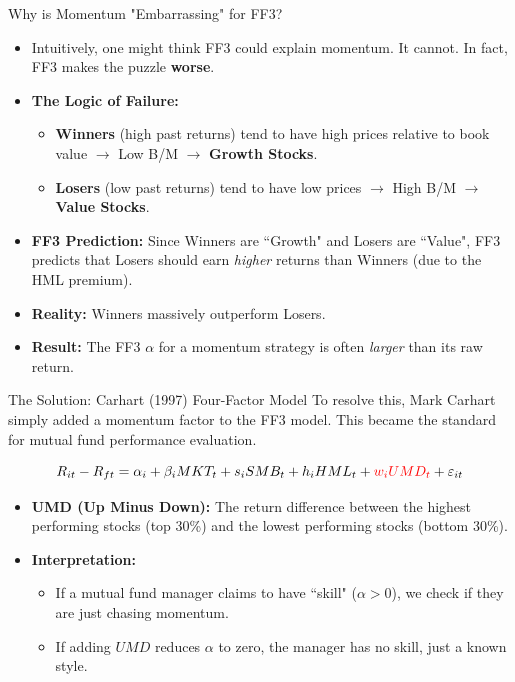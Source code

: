 \documentclass{beamer}
\begin{document}
\begin{frame}{Why is Momentum "Embarrassing" for FF3?}
	\begin{itemize}
		\item Intuitively, one might think FF3 could explain momentum. It cannot. In fact, FF3 makes the puzzle \textbf{worse}.
		\item \textbf{The Logic of Failure:}
		\begin{itemize}
			\item \textbf{Winners} (high past returns) tend to have high prices relative to book value $\rightarrow$ Low B/M $\rightarrow$ \textbf{Growth Stocks}.
			\item \textbf{Losers} (low past returns) tend to have low prices $\rightarrow$ High B/M $\rightarrow$ \textbf{Value Stocks}.
		\end{itemize}
		\item \textbf{FF3 Prediction:} Since Winners are ``Growth" and Losers are ``Value", FF3 predicts that Losers should earn \textit{higher} returns than Winners (due to the HML premium).
		\item \textbf{Reality:} Winners massively outperform Losers.
		\item \textbf{Result:} The FF3 $\alpha$ for a momentum strategy is often \textit{larger} than its raw return.
	\end{itemize}
\end{frame}

\begin{frame}{The Solution: Carhart (1997) Four-Factor Model}
	To resolve this, Mark Carhart simply added a momentum factor to the FF3 model. This became the standard for mutual fund performance evaluation.
	
	\begin{equation}
		R_{it} - R_{ft} = \alpha_i + \beta_i MKT_t + s_i SMB_t + h_i HML_t + \textcolor{red}{w_i UMD_t} + \varepsilon_{it}
	\end{equation}
	
	\begin{itemize}
		\item \textbf{UMD (Up Minus Down):} The return difference between the highest performing stocks (top 30\%) and the lowest performing stocks (bottom 30\%).
		\item \textbf{Interpretation:}
		\begin{itemize}
			\item If a mutual fund manager claims to have ``skill" ($\alpha > 0$), we check if they are just chasing momentum.
			\item If adding $UMD$ reduces $\alpha$ to zero, the manager has no skill, just a known style.
		\end{itemize}
	\end{itemize}
\end{frame}
\end{document}
